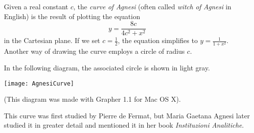\documentclass[12pt]{article}
\begin{document}
Given a real constant $c$, the {\em curve of Agnesi} (often called {\em witch of Agnesi} in English) is the result of plotting the equation $$y = \frac{8c}{4c^2 + x^2}$$ in the Cartesian plane. If we set $c = \frac{1}{2}$, the equation simplifies to $y = \frac{1}{1 + x^2}$. Another way of drawing the curve employs a circle of radius $c$.

In the following diagram, the associated circle is shown in light gray.

\begin{center}
\texttt{[image: AgnesiCurve]}
\end{center}

(This diagram was made with Grapher 1.1 for Mac OS X).

This curve was first studied by Pierre de Fermat, but Maria Gaetana Agnesi later studied it in greater detail and mentioned it in her book {\it Instituzioni Analitiche}.
\end{document}
